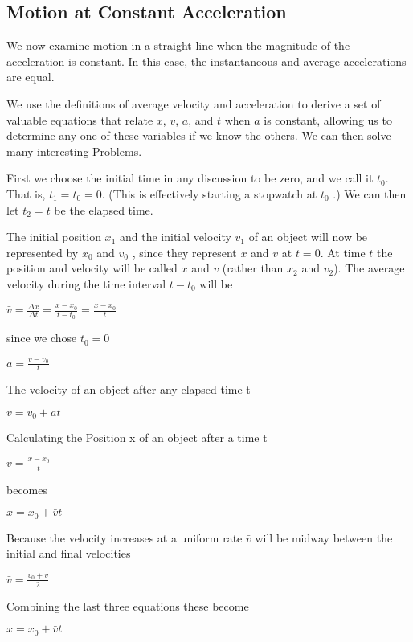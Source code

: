 \documentclass{extarticle}
\begin{document}
\begin{tcolorbox}[enhanced jigsaw,sharp corners,coltext=black,colback=BurntOrange!25!white,boxrule=pt,breakable,size=minimal]


\subsection{Motion at Constant Acceleration}

We now examine motion in a straight line when the magnitude of the acceleration is constant. In this case, the instantaneous and average accelerations are equal.


We use the definitions of average velocity and acceleration to derive a set of valuable equations that relate $x$, $v$, $a$, and $t$ when $a$ is constant, allowing us to determine any one of these variables if we know the others. We can then solve many interesting Problems.

First we choose the initial time in any discussion to be zero, and we call it $t_0$.
That is,  $t_1 = t_0 = 0$. (This is effectively starting a stopwatch at $t_0$ .)
We can then let $t_2 = t$ be the elapsed time.

The initial position $x_1$ and the initial velocity $v_1$  of an object will now be represented by $x_0$ and $v_0$ , since they represent $x$ and $v$ at $t = 0$.
At time $t$ the position and velocity will be called $x$ and $v$ (rather than $x_2$ and $v_2$).
The average velocity during the time interval $t - t_0$ will be

$\bar{v} = \frac{\Delta x}{\Delta t} = \frac{x - x_0}{t - t_0} = \frac{x - x_0}{t}$

since we chose $t_0 = 0$


$a = \frac{v - v_0}{t}$


The velocity of an object after any elapsed time t

$v = v_0 + at$

Calculating the 
Position x of an object after a time t

$\bar{v} = \frac{x - x_0}{t}$

becomes

$x = x_0 + \bar{v}t$


Because the velocity increases at a uniform rate $\bar{v}$ will be midway between the initial and final velocities

$\bar{v} = \frac{v_0 + v}{2}$


Combining the last three equations these become

$x = x_0 + \bar{v}t$


\end{tcolorbox}
\end{document}
